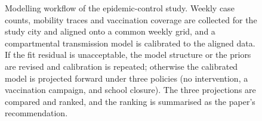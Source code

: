 \documentclass{article}
\begin{document}
\begin{figure}[htbp]
  \caption{Modelling workflow of the epidemic-control study. Weekly case
  counts, mobility traces and vaccination coverage are collected for the
  study city and aligned onto a common weekly grid, and a compartmental
  transmission model is calibrated to the aligned data. If the fit residual
  is unacceptable, the model structure or the priors are revised and
  calibration is repeated; otherwise the calibrated model is projected
  forward under three policies (no intervention, a vaccination campaign, and
  school closure). The three projections are compared and ranked, and the
  ranking is summarised as the paper's recommendation.}
  \label{fig:workflow}
\end{figure}
\end{document}
